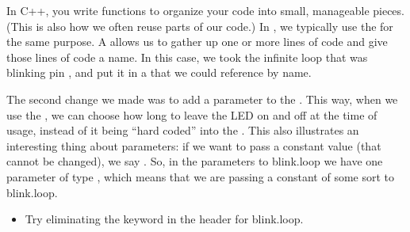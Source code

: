 \discussion
In C++, you write functions to organize your code into small, manageable pieces. (This is also how we often reuse parts of our code.) In \occam, we typically use the \PROC for the same purpose. A \PROC allows us to gather up one or more lines of code and give those lines of code a name. In this case, we took the infinite loop that was blinking pin \pinthirteen, and put it in a \PROC that we could reference by name.

The second change we made was to add a parameter to the \PROC. This way, when we use the \PROC, we can choose how long to leave the LED on and off at the time of usage, instead of it being ``hard coded'' into the . This also illustrates an interesting thing about \occam parameters: if we want to pass a constant value (that cannot be changed), we say \VAL. So, in the parameters to {\code blink.loop} we have one parameter of type \VAL \INT, which means that we are passing a constant of some sort to {\code blink.loop}.

\makingthingsbreak
\begin{itemize}
	\item Try eliminating the keyword \VAL in the \PROC header for {\code blink.loop}.
\end{itemize}

\seealso

\XXX


% 
\section{}
\problem

\solution

\discussion

\makingthingsbreak

\seealso

\XXX